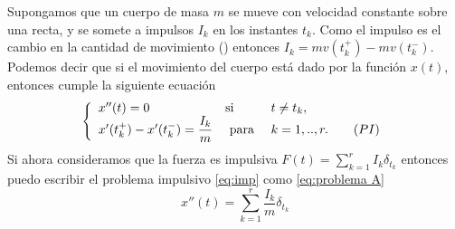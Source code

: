 \begin{example} \label{ejemplo1}
    Supongamos que un cuerpo de masa $m$ se mueve con velocidad constante sobre una recta, y se somete a impulsos $I_k$ en los instantes $t_k$. Como el impulso es el cambio en la cantidad de movimiento (\cite{Serway}) entonces $I_k=mv(t_k^+)-mv(t_k^-)$. Podemos decir que si el movimiento del cuerpo está dado por la función $x(t)$, entonces cumple la siguiente ecuación 
    \begin{equation}
	\left\lbrace \begin{array}{lll} 
		\label{eq:imp}
        x''(t)=0 & \text{si }& t\neq t_k,\\
		x'(t_k^+)-x'(t_k^-)=\dfrac{I_k} {m} & \text{ para }& k=1,..,r.\tag{${PI}$}
	\end{array}\right. 
\end{equation}
Si ahora consideramos que la fuerza es impulsiva $F(t)=\displaystyle\sum_{k=1}^r I_k\delta_{t_k}$ entonces puedo escribir el problema impulsivo \ref{eq:imp} como \ref{eq:problema A}
$$x''(t)=\sum_{k=1}^r\dfrac{I_k}{m}\delta_{t_k}$$
\end{example}








